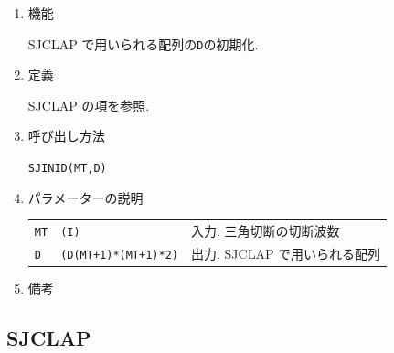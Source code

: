 \documentclass[a4j]{jarticle}
\begin{document}
\begin{enumerate}

\item 機能 

SJCLAP で用いられる配列の{\tt D}の初期化.

\item 定義

SJCLAP の項を参照.

\item 呼び出し方法 

{\tt SJINID(MT,D)}
  
\item パラメーターの説明

\begin{tabular}{lll}
{\tt MT} & {\tt (I)} & 入力. 三角切断の切断波数\\
{\tt D} & {\tt (D(MT+1)*(MT+1)*2)} & 出力. SJCLAP で用いられる配列
\end{tabular}

\item 備考

    
\end{enumerate}


\subsection{SJCLAP}
\end{document}
